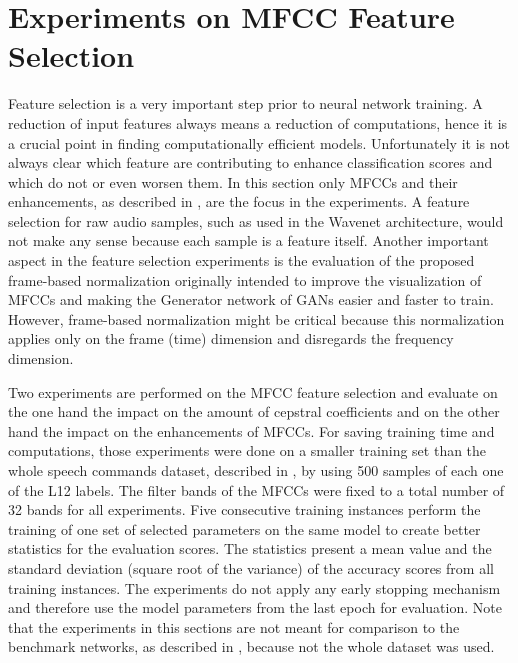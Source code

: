 
\section{Experiments on MFCC Feature Selection}\label{sec:exp_fs}
Feature selection is a very important step prior to neural network training.
A reduction of input features always means a reduction of computations, hence it is a crucial point in finding computationally efficient models.
Unfortunately it is not always clear which feature are contributing to enhance classification scores and which do not or even worsen them.
In this section only MFCCs and their enhancements, as described in , are the focus in the experiments.
A feature selection for raw audio samples, such as used in the Wavenet architecture, would not make any sense because each sample is a feature itself.
Another important aspect in the feature selection experiments is the evaluation of the proposed frame-based normalization  originally intended to improve the visualization of MFCCs and making the Generator network of GANs easier and faster to train.
However, frame-based normalization might be critical because this normalization applies only on the frame (time) dimension and disregards the frequency dimension.

Two experiments are performed on the MFCC feature selection and evaluate on the one hand the impact on the amount of cepstral coefficients and on the other hand the impact on the enhancements of MFCCs.
For saving training time and computations, those experiments were done on a smaller training set than the whole speech commands dataset, described in , by using 500 samples of each one of the L12 labels.
The filter bands of the MFCCs were fixed to a total number of 32 bands for all experiments.
Five consecutive training instances perform the training of one set of selected parameters on the same model to create better statistics for the evaluation scores.
The statistics present a mean value and the standard deviation (square root of the variance) of the accuracy scores from all training instances.
The experiments do not apply any early stopping mechanism and therefore use the model parameters from the last epoch for evaluation.
Note that the experiments in this sections are not meant for comparison to the benchmark networks, as described in , because not the whole dataset was used.



